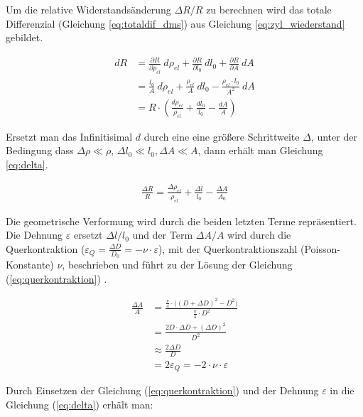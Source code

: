 Um die relative Widerstandsänderung $\Delta R / R$ zu berechnen wird das totale Differenzial (Gleichung \ref{eq:totaldif_dms}) aus Gleichung \ref{eq:zyl_wiederstand} gebildet.


\begin{align}  
\label{eq:totaldif_dms}
	dR &=\frac{\partial R}{\partial \rho_{el}} \: d\rho_{el}+\frac{\partial R}{\partial l_0} \: dl_0+\frac{\partial R}{\partial A} \: dA \\[1em]
		&= \frac{l_0}{A} ~ d\rho_{el} + \frac{\rho_{el}}{A} \: dl_0 - \frac{\rho_{el} \cdot l_0}{A^2} \: dA \\[1em]
		&= R \cdot ( \frac{d\rho_{el}}{\rho_{el}} + \frac{dl_0}{l_0} - \frac{dA}{A} )
\end{align}


Ersetzt man das Infinitisimal $d$ durch eine eine größere Schrittweite $\Delta$, unter der Bedingung dass $\Delta \rho \ll \rho,\, \Delta l_0 \ll l_0, \Delta A \ll A$, dann erhält man Gleichung \ref{eq:delta}. 

\begin{align}
\frac{\Delta R}{R} = \frac{\Delta \rho_{el}}{\rho_{el}} + \frac{\Delta l}{l_0} - \frac{\Delta A}{A_0}
\end{align}

Die geometrische Verformung wird durch die beiden letzten Terme repräsentiert. Die Dehnung $\varepsilon$ ersetzt $\Delta l / l_0$ und der Term $\Delta A/A$ wird durch die Querkontraktion ($\varepsilon_Q = \frac{\Delta D}{D_0} = - \nu \cdot \varepsilon$), mit der Querkontraktionszahl (Poisson-Konstante) $\nu$, beschrieben und führt zu der Lösung der Gleichung (\ref{eq:querkontraktion}) .

 \begin{align}
\frac{\Delta A}{A} &= \frac{\frac{\pi}{4} \cdot \bigl((D+\Delta D)^2-D^2 \bigr)}{\frac{\pi}{4} \cdot D^2}  \\[0.7em]
&= \frac{2D \cdot \Delta D + (\Delta D)^2}{D^2} \\[0.7em]
&\approx \frac{2 \Delta D}{D} \\[0.7em]
&=2\varepsilon_Q = -2 \cdot \nu \cdot \varepsilon %
\end{align}

Durch Einsetzen der Gleichung (\ref{eq:querkontraktion}) und der Dehnung $\varepsilon$ in die Gleichung (\ref{eq:delta}) erhält man:

